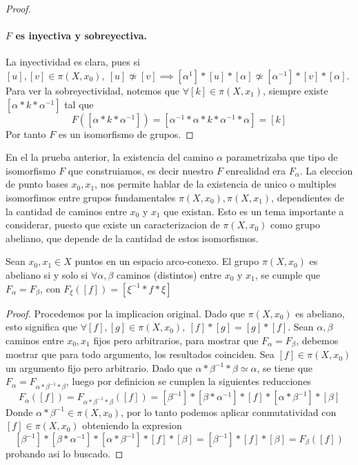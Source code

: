 {\begin{proof}
  \paragraph{\(F\) es inyectiva y sobreyectiva.} La inyectividad es
  clara, pues si \([u],[v] \in \pi (X, x_0),\ [u] \not \simeq [v]
  \implies [\alpha^{1}] * [u] * [\alpha] \not \simeq [\alpha^{-1}] * [v]
  * [\alpha]\). Para ver la sobreyectividad, notemos que \(\forall [k] \in
  \pi (X, x_1) \), siempre existe \( [\alpha * k * \alpha^{-1}]\) tal
  que
  \[ F ([\alpha * k * \alpha^{-1}]) = [\alpha^{-1} * \alpha * k *
    \alpha^{-1} * \alpha] = [k]\]
  Por tanto \(F\) es un isomorfismo de grupos.
\end{proof}
En el la prueba anterior, la existencia del camino \(\alpha\)
parametrizaba que tipo de isomorfismo \(F\) que construiamos, es decir
nuestro \(F\) enrealidad era \(F_{\alpha}\). La eleccion de punto bases
\(x_0, x_1\), nos permite hablar de la existencia de unico o multiples
isomorfimos entre grupos fundamentales \(\pi (X, x_0), \pi (X, x_1) \),
dependientes de la cantidad de caminos entre \(x_0\) y \(x_1\) que
existan. Esto es un tema importante a considerar, puesto que existe un
caracterizacion de \(\pi (X, x_0) \) como grupo abeliano, que depende de
la cantidad de estos isomorfismos.
\begin{teorema}
  Sean \(x_0, x_1 \in X\) puntos en un espacio arco-conexo. El grupo
  \(\pi (X, x_0) \) es abeliano si y solo si \(\forall \alpha, \beta\)
  caminos (distintos) entre \(x_0\) y \(x_1\), se cumple que \(F_\alpha =
  F_\beta\), con \(F_{\xi} ([f]) = [\xi^{-1} * f * \xi] \)
\end{teorema}
\begin{proof}
  Procedemos por la implicacion original. Dado que \(\pi (X, x_0)\) es
  abeliano, esto significa que \(\forall [f],[g] \in \pi (X, x_0),\ [f]
  * [g] = [g] * [f]\). Sean \(\alpha, \beta\) caminos entre \(x_0,x_1\)
  fijos pero arbitrarios, para mostrar que \(F_\alpha = F_\beta\),
  debemos mostrar que para todo argumento, los resultados coinciden. Sea
  \([f] \in \pi (X, x_0) \) un argumento fijo pero arbitrario. Dado que
  \(\alpha * \beta^{-1} * \beta \simeq \alpha \), se tiene que
  \(F_\alpha = F _{\alpha * \beta^{-1} * \beta}\), luego por definicion
  se cumplen la siguientes reducciones
  \[ F_\alpha ([f]) = F_{\alpha * \beta^{-1} * \beta} ([f]) =
    [\beta^{-1}] * [\beta * \alpha^{-1}] * [f] * [\alpha * \beta^{-1}]
    * [\beta] \]
  Donde \(\alpha * \beta^{-1} \in \pi (X, x_0) \), por lo tanto podemos
  aplicar conmutatividad con \([f] \in \pi (X,x_0)\) obteniendo la expresion
  \[ [\beta^{-1}] * [\beta * \alpha^{-1}] * [\alpha * \beta^{-1}] * [f]
    * [\beta] = [\beta^{-1}] * [f] * [\beta] = F_\beta ([f]) \]
  probando asi lo buscado.


\end{proof}}
